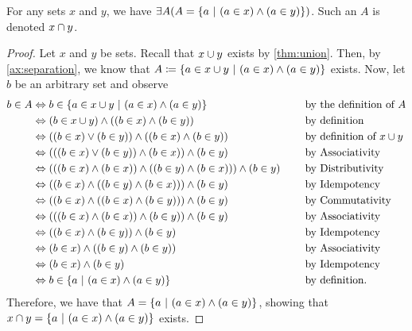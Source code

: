 \begin{theorem}\label{thm:intersection}
    For any sets \(x\) and \(y\), we have \(\exists A \pn*{A = \set*{a \suchthat (a \in x) \meet (a \in y)}}\).
    Such an \(A\) is denoted \(x \cap y\).
\end{theorem}
\begin{proof}
    Let \(x\) and \(y\) be sets. Recall that \(x \cup y\) exists by \autoref{thm:union}.
    Then, by \autoref{ax:separation},
    we know that \(A \defn \set*{a \in x \union y \suchthat (a \in x) \meet (a \in y)}\) exists.
    Now, let \(b\) be an arbitrary set and observe
    \begin{alignat*}{2}
        b \in A &\iff b \in \set*{a \in x \union y \suchthat (a \in x) \meet (a \in y)} &&\text{by the definition of \(A\)} \\
                &\iff (b \in x \union y) \meet \pn*{(b \in x) \meet (b \in y)} &&\text{by definition} \\
                &\iff \pn*{(b \in x) \join (b \in y)} \meet \pn*{(b \in x) \meet (b \in y)} &&\text{by definition of } x \union y \\
                &\iff \pn*{\pn*{(b \in x) \join (b \in y)} \meet (b \in x)} \meet (b \in y) &&\text{by Associativity} \\
                &\iff \pn*{\pn*{(b \in x) \meet (b \in x)} \meet \pn*{(b \in y) \meet (b \in x)}} \meet (b \in y)~~~~&&\text{by Distributivity} \\
                &\iff \pn*{(b \in x) \meet \pn*{(b \in y) \meet (b \in x)}} \meet (b \in y) &&\text{by Idempotency} \\
                &\iff \pn*{(b \in x) \meet \pn*{(b \in x) \meet (b \in y)}} \meet (b \in y) &&\text{by Commutativity} \\
                &\iff \pn*{\pn*{(b \in x) \meet (b \in x)} \meet (b \in y)} \meet (b \in y) &&\text{by Associativity} \\
                &\iff \pn*{(b \in x) \meet (b \in y)} \meet (b \in y) &&\text{by Idempotency} \\
                &\iff (b \in x) \meet \pn*{(b \in y) \meet (b \in y)} &&\text{by Associativity} \\
                &\iff (b \in x) \meet (b \in y) &&\text{by Idempotency} \\
                &\iff b \in \set*{a \suchthat (a \in x) \meet (a \in y)} &&\text{by definition}.
    \end{alignat*}
    Therefore, we have that \(A = \set*{a \suchthat (a \in x) \meet (a \in y)}\),
    showing that \(x \intersect y = \set*{a \suchthat (a \in x) \meet (a \in y)}\) exists.
\end{proof}

